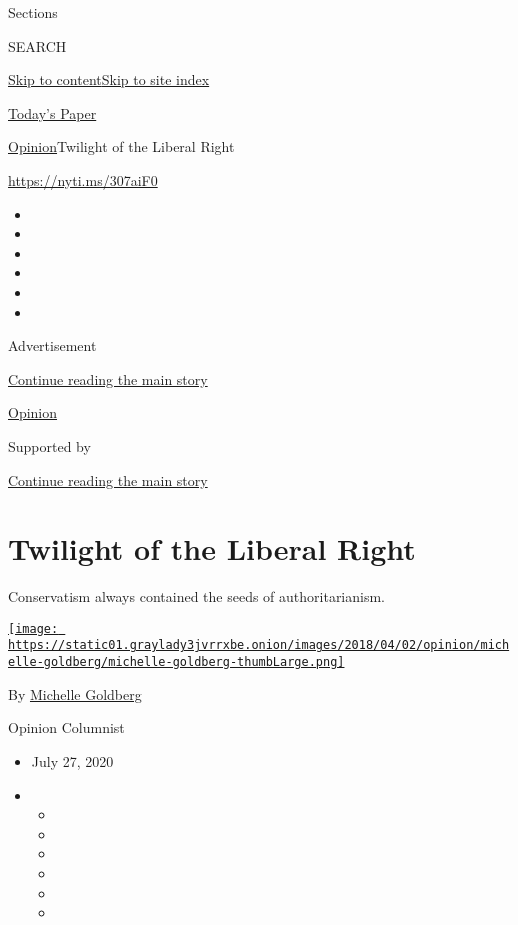 Sections

SEARCH

\protect\hyperlink{site-content}{Skip to
content}\protect\hyperlink{site-index}{Skip to site index}

\href{https://myaccount.nytimes3xbfgragh.onion/auth/login?response_type=cookie\&client_id=vi}{}

\href{https://www.nytimes3xbfgragh.onion/section/todayspaper}{Today's
Paper}

\href{/section/opinion}{Opinion}\textbar{}Twilight of the Liberal Right

\url{https://nyti.ms/307aiF0}

\begin{itemize}
\item
\item
\item
\item
\item
\item
\end{itemize}

Advertisement

\protect\hyperlink{after-top}{Continue reading the main story}

\href{/section/opinion}{Opinion}

Supported by

\protect\hyperlink{after-sponsor}{Continue reading the main story}

\hypertarget{twilight-of-the-liberal-right}{%
\section{Twilight of the Liberal
Right}\label{twilight-of-the-liberal-right}}

Conservatism always contained the seeds of authoritarianism.

\href{https://www.nytimes3xbfgragh.onion/by/michelle-goldberg}{\texttt{[image: https://static01.graylady3jvrrxbe.onion/images/2018/04/02/opinion/michelle-goldberg/michelle-goldberg-thumbLarge.png]}}

By
\href{https://www.nytimes3xbfgragh.onion/by/michelle-goldberg}{Michelle
Goldberg}

Opinion Columnist

\begin{itemize}
\item
  July 27, 2020
\item
  \begin{itemize}
  \item
  \item
  \item
  \item
  \item
  \item
  \end{itemize}
\end{itemize}

